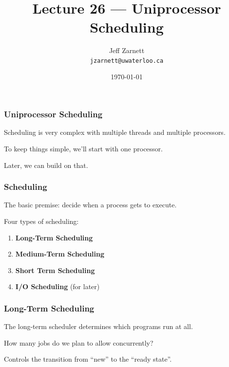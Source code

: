 

\title{Lecture 26 --- Uniprocessor Scheduling }

\author{Jeff Zarnett \\ \small \texttt{jzarnett@uwaterloo.ca}}
\date{\today}




\begin{frame}
  \titlepage

 \end{frame}



\begin{frame}
\frametitle{Uniprocessor Scheduling}

Scheduling is very complex with multiple threads and multiple processors.

To keep things simple, we'll start with one processor.

Later, we can build on that.

\end{frame}


\begin{frame}
\frametitle{Scheduling}

The basic premise: decide when a process gets to execute. 

Four types of scheduling: 

\begin{enumerate}
	\item \textbf{Long-Term Scheduling}
	\item \textbf{Medium-Term Scheduling}
	\item \textbf{Short Term Scheduling}
	\item \textbf{I/O Scheduling} (for later)
\end{enumerate}

\end{frame}



\begin{frame}
\frametitle{Long-Term Scheduling}

The long-term scheduler determines which programs run at all.

How many jobs do we plan to allow concurrently?

Controls the transition from ``new'' to the ``ready state''.


\end{frame}

